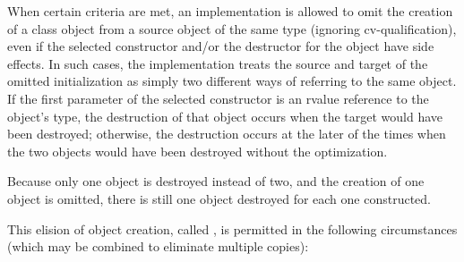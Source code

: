 \pnum
{}%
%
%
%
%
When certain criteria are met, an implementation is
allowed to omit the creation of a class object from
a source object of the same type (ignoring cv-qualification),
even if the selected constructor and/or the
destructor for the object have
%
side effects.  In such cases, the
implementation treats the source and target of the
omitted initialization as simply two different ways of
referring to the same object. If the first parameter of the
selected constructor is an rvalue reference to the object's type,
the destruction of that object occurs when the target would have been destroyed;
otherwise, the destruction occurs at the later of the times when the
two objects would have been destroyed without the
optimization.
\begin{note}
Because only one object is destroyed instead of two,
and the creation of one object is omitted,
there is still one object destroyed for each one constructed.
\end{note}
This elision of object creation, called
%
%
,
is permitted in the
following circumstances (which may be combined to
eliminate multiple copies):

